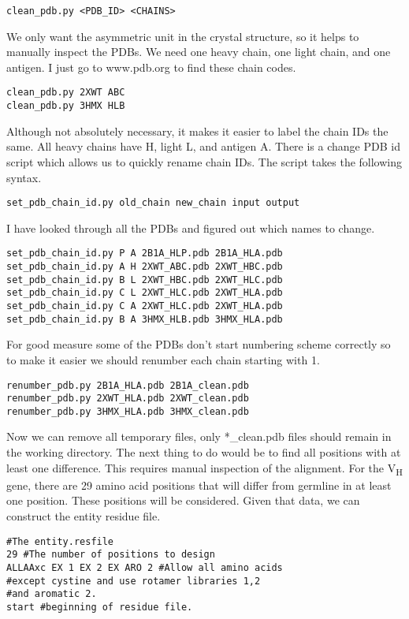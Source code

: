 \begin{lstlisting}
clean_pdb.py <PDB_ID> <CHAINS>
\end{lstlisting}

We only want the asymmetric unit in the crystal structure, so it helps to manually inspect the PDBs. We need one heavy chain, one light chain, and one antigen. I just go to www.pdb.org to find these chain codes.
\begin{lstlisting}
clean_pdb.py 2XWT ABC
clean_pdb.py 3HMX HLB
\end{lstlisting}
Although not absolutely necessary, it makes it easier to label the chain IDs the same. All heavy chains have H, light L, and antigen A. There is a change PDB id script which allows us to quickly rename chain IDs. The script takes the following syntax.

\begin{lstlisting}
set_pdb_chain_id.py old_chain new_chain input output
\end{lstlisting}
I have looked through all the PDBs and figured out which names to change.

\begin{lstlisting}
set_pdb_chain_id.py P A 2B1A_HLP.pdb 2B1A_HLA.pdb
set_pdb_chain_id.py A H 2XWT_ABC.pdb 2XWT_HBC.pdb
set_pdb_chain_id.py B L 2XWT_HBC.pdb 2XWT_HLC.pdb
set_pdb_chain_id.py C L 2XWT_HLC.pdb 2XWT_HLA.pdb
set_pdb_chain_id.py C A 2XWT_HLC.pdb 2XWT_HLA.pdb
set_pdb_chain_id.py B A 3HMX_HLB.pdb 3HMX_HLA.pdb
\end{lstlisting}
For good measure some of the PDBs don't start numbering scheme correctly so to make it easier we should renumber each chain starting with 1.

\begin{lstlisting}
renumber_pdb.py 2B1A_HLA.pdb 2B1A_clean.pdb
renumber_pdb.py 2XWT_HLA.pdb 2XWT_clean.pdb
renumber_pdb.py 3HMX_HLA.pdb 3HMX_clean.pdb
\end{lstlisting}
Now we can remove all temporary files, only *\_clean.pdb files should remain in the working directory. The next thing to do would be to find all positions with at least one difference. This requires manual inspection of the alignment. For the V\textsubscript{H} gene, there are 29 amino acid positions that will differ from germline in at least one position. These positions will be considered. Given that data, we can construct the entity residue file.

\begin{lstlisting}
#The entity.resfile
29 #The number of positions to design
ALLAAxc EX 1 EX 2 EX ARO 2 #Allow all amino acids
#except cystine and use rotamer libraries 1,2
#and aromatic 2.
start #beginning of residue file.
\end{lstlisting}

